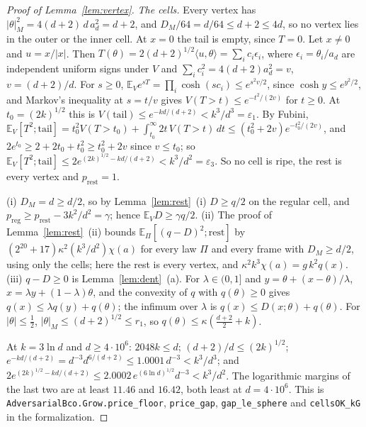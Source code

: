 \documentclass[11pt]{amsart}
\theoremstyle{definition}
\numberwithin{equation}{section}
\newcommand{\E}{\mathbb{E}}
\newcommand{\ip}[1]{\langle #1\rangle}
\begin{document}
\begin{proof}[Proof of Lemma~\ref{lem:vertex}]
\emph{The cells.} Every vertex has $|\theta|_M^2=4(d+2)\,d\,a_d^2=d+2$, and $D_M/64=d/64\le d+2\le4d$, so no vertex lies in the outer or the inner cell. At $x=0$ the tail is empty, since $T=0$. Let $x\ne0$ and $u=x/|x|$. Then $T(\theta)=2(d+2)^{1/2}\ip{u,\theta}=\sum_ic_i\epsilon_i$, where $\epsilon_i=\theta_i/a_d$ are independent uniform signs under $V$ and $\sum_ic_i^2=4(d+2)a_d^2=v$, $v=(d+2)/d$. For $s\ge0$, $\E_Ve^{sT}=\prod_i\cosh(sc_i)\le e^{s^2v/2}$, since $\cosh y\le e^{y^2/2}$, and Markov's inequality at $s=t/v$ gives $V(T>t)\le e^{-t^2/(2v)}$ for $t\ge0$. At $t_0=(2k)^{1/2}$ this is $V(\mathrm{tail})\le e^{-kd/(d+2)}<k^3/d^3=\varepsilon_1$. By Fubini, $\E_V[T^2;\mathrm{tail}]=t_0^2V(T>t_0)+\int_{t_0}^\infty2t\,V(T>t)\,dt\le(t_0^2+2v)e^{-t_0^2/(2v)}$, and $2e^{t_0}\ge2+2t_0+t_0^2\ge t_0^2+2v$ since $v\le t_0$; so $\E_V[T^2;\mathrm{tail}]\le2e^{(2k)^{1/2}-kd/(d+2)}<k^3/d^2=\varepsilon_3$. So no cell is ripe, the rest is every vertex and $p_{\mathrm{rest}}=1$.

(i) $D_M=d\ge d/2$, so by Lemma~\ref{lem:rest}~(i) $D\ge q/2$ on the regular cell, and $p_{\mathrm{reg}}\ge p_{\mathrm{rest}}-3k^2/d^2=\gamma$; hence $\E_VD\ge\gamma q/2$. (ii) The proof of Lemma~\ref{lem:rest}~(ii) bounds $\E_\Pi[(q-D)^2;\mathrm{rest}]$ by $(2^{20}+17)\kappa^2(k^3/d^2)\chi(a)$ for every law $\Pi$ and every frame with $D_M\ge d/2$, using only the cells; here the rest is every vertex, and $\kappa^2k^3\chi(a)=g\,k^2q(x)$. (iii) $q-D\ge0$ is Lemma~\ref{lem:dent}~(a). For $\lambda\in(0,1]$ and $y=\theta+(x-\theta)/\lambda$, $x=\lambda y+(1-\lambda)\theta$, and the convexity of $q$ with $q(\theta)\ge0$ gives $q(x)\le\lambda q(y)+q(\theta)$; the infimum over $\lambda$ is $q(x)\le D(x;\theta)+q(\theta)$. For $|\theta|\le\frac12$, $|\theta|_M\le(d+2)^{1/2}\le r_1$, so $q(\theta)\le\kappa(\frac{d+2}2+k)$.

At $k=3\ln d$ and $d\ge4\cdot10^6$: $2048k\le d$; $(d+2)/d\le(2k)^{1/2}$; $e^{-kd/(d+2)}=d^{-3}d^{6/(d+2)}\le1.0001\,d^{-3}<k^3/d^3$; and $2e^{(2k)^{1/2}-kd/(d+2)}\le2.0002\,e^{(6\ln d)^{1/2}}d^{-3}<k^3/d^2$. The logarithmic margins of the last two are at least $11.46$ and $16.42$, both least at $d=4\cdot10^6$.
This is \texttt{AdversarialBco.Grow.price\_floor}, \texttt{price\_gap}, \texttt{gap\_le\_sphere} and \texttt{cellsOK\_kG} in the formalization.
\end{proof}
\end{document}
